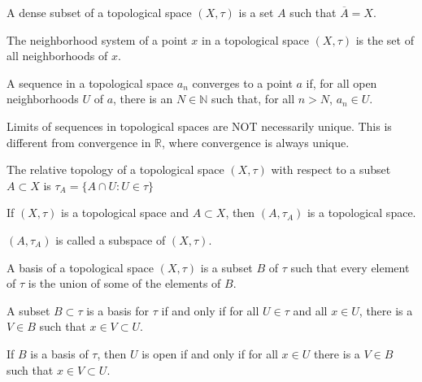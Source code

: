 \documentclass[crop=false,class=book,oneside]{standalone}
\begin{document}
        \begin{definition}
            A dense subset of a topological
            space $(X,\tau)$ is a set $A$
            such that $\overline{A}=X$.
        \end{definition}
        \begin{definition}
            The neighborhood system of a point
            $x$ in a topological space $(X,\tau)$
            is the set of all neighborhoods of
            $x$.
        \end{definition}
        \begin{definition}
            A sequence in a topological space
            $a_{n}$ converges to a point $a$ if,
            for all open neighborhoods $U$ of $a$,
            there is an $N\in\mathbb{N}$ such that,
            for all $n>N$, $a_{n}\in{U}$.
        \end{definition}
        Limits of sequences in topological spaces are NOT
        necessarily unique. This is different from convergence
        in $\mathbb{R}$, where convergence is always unique.
        \begin{definition}
            The relative topology of a
            topological space $(X,\tau)$ with
            respect to a subset $A\subset{X}$
            is $\tau_{A}=\{A\cap{U}:U\in\tau\}$
        \end{definition}
        \begin{theorem}
            If $(X,\tau)$ is a topological space and
            $A\subset{X}$, then
            $(A,\tau_{A})$ is a topological space.
        \end{theorem}
        $(A,\tau_{A})$ is called a subspace of
        $(X,\tau)$.
        \begin{definition}
            A basis of a topological space
            $(X,\tau)$ is a subset $B$ of
            $\tau$ such that every element
            of $\tau$ is the union of some of the
            elements of $B$.
        \end{definition}
        \begin{theorem}
            A subset $B\subset\tau$ is a basis
            for $\tau$ if and only if for all
            $U\in\tau$ and all $x\in{U}$, there is
            a $V\in{B}$ such that
            $x\in{V}\subset{U}$.
        \end{theorem}
        \begin{theorem}
            If $B$ is a basis of $\tau$, then
            $U$ is open if and only if for all
            $x\in{U}$ there is a $V\in{B}$ such that
            $x\in{V}\subset{U}$.
        \end{theorem}
\end{document}
